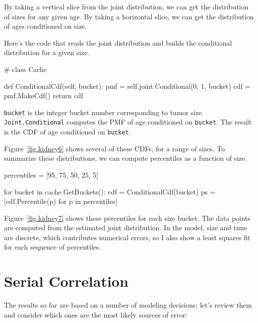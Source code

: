 \documentclass[12pt]{book}
\theoremstyle{exercise}
\begin{document}
By taking a vertical slice from the joint distribution, we can get the
distribution of sizes for any given age.  By taking a horizontal
slice, we can get the distribution of ages conditioned on size.

Here's the code that reads the joint distribution and builds
the conditional distribution for a given size.

\begin{code}
# class Cache

    def ConditionalCdf(self, bucket):
        pmf = self.joint.Conditional(0, 1, bucket)
        cdf = pmf.MakeCdf()
        return cdf
\end{code}

\verb"bucket" is the integer bucket number corresponding to
tumor size.  {\tt Joint.Conditional} computes the
PMF of age conditioned on {\tt bucket}.
The result is the CDF of age conditioned on {\tt bucket}.

Figure~\ref{fig.kidney6} shows several of these CDFs, for
a range of sizes.  To summarize these distributions, we can
compute percentiles as a function of size.

\begin{code}
    percentiles = [95, 75, 50, 25, 5]

    for bucket in cache.GetBuckets():
        cdf = ConditionalCdf(bucket)      
        ps = [cdf.Percentile(p) for p in percentiles]
\end{code}

Figure~\ref{fig.kidney7} shows these percentiles for each
size bucket.  The data points are computed from the estimated
joint distribution.  In the model, size and time are discrete,
which contributes numerical errors, so I also show a least 
squares fit for each sequence of percentiles.


\section{Serial Correlation}
\label{serial}

The results so far are based on a number of modeling decisions;
let's review them and consider which ones are the most
likely sources of error:
\end{document}
